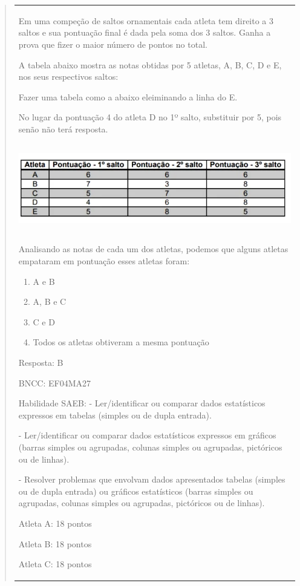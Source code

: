\begin{enumerate}
\begin{escolha}
\begin{enumerate}
\begin{itemize}
\begin{itemize}
\begin{escolha}
\begin{quote}
\begin{escolha}
{\begin{longtable}[]{@{}l@{}}
\begin{itemize}
Em uma compeção de saltos ornamentais cada atleta tem direito a 3 saltos
e sua pontuação final é dada pela soma dos 3 saltos. Ganha a prova que
fizer o maior número de pontos no total.

A tabela abaixo mostra as notas obtidas por 5 atletas, A, B, C, D e E,
nos seus respectivos saltos:

Fazer uma tabela como a abaixo eleiminando a linha do E.

No lugar da pontuação 4 do atleta D no 1º salto, substituir por 5, pois
senão não terá resposta.

\includegraphics[width=5.90556in,height=1.52431in]{media/image169.png}

Analisando as notas de cada um dos atletas, podemos que alguns atletas
empataram em pontuação esses atletas foram:

\begin{enumerate}
\def\labelenumi{\alph{enumi})}
\item
  A e B
\item
  A, B e C
\item
  C e D
\item
  Todos os atletas obtiveram a mesma pontuação
\end{enumerate}

Resposta: B

BNCC: EF04MA27

Habilidade SAEB: - Ler/identificar ou comparar dados estatísticos
expressos em tabelas (simples ou de dupla entrada).

- Ler/identificar ou comparar dados estatísticos expressos em gráficos
(barras simples ou agrupadas, colunas simples ou agrupadas, pictóricos
ou de linhas).

- Resolver problemas que envolvam dados apresentados tabelas (simples ou
de dupla entrada) ou gráficos estatísticos (barras simples ou agrupadas,
colunas simples ou agrupadas, pictóricos ou de linhas).

Atleta A: 18 pontos

Atleta B: 18 pontos

Atleta C: 18 pontos


\end{itemize}
\end{longtable}}
\end{escolha}
\end{quote}
\end{escolha}
\end{itemize}
\end{itemize}
\end{enumerate}
\end{escolha}
\end{enumerate}
